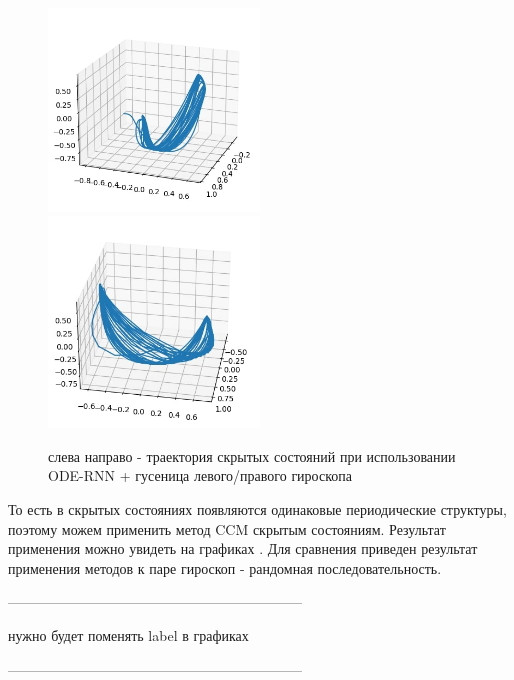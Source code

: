 \documentclass[12pt, twoside]{article}
\begin{document}
\begin{figure}
	\includegraphics[width = 0.5\textwidth]{images/trajectory_left.jpg} \hfill
	\includegraphics[width = 0.5\textwidth]{images/trajectory_right.jpg}
	\caption{слева направо - траектория скрытых состояний при использовании ODE-RNN + гусеница левого/правого гироскопа}
\end{figure}		
	
	То есть в скрытых состояниях появляются одинаковые периодические структуры, поэтому можем применить метод CCM  скрытым состояниям. Результат применения можно увидеть на графиках \label{CCM_apply}. Для сравнения приведен результат применения методов к паре гироскоп - рандомная последовательность.
	
---------------------------------------------------------------

нужно будет поменять label в графиках
	
---------------------------------------------------------------
\end{document}
